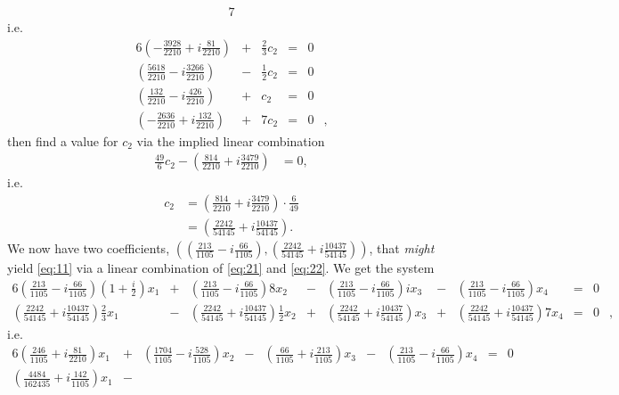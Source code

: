 \documentclass[12pt]{article}
\begin{document}
\begin{enumerate}
\begin{alignat*}{7}
      \end{alignat*}
      i.e.
      \begin{alignat*}{6}
        (-\frac{3928}{2210} + i\frac{81}{2210}) & {}+{} & \frac{2}{3}c_2 & {}={} & 0&\\
        (\frac{5618}{2210} - i\frac{3266}{2210}) & {}-{} & \frac{1}{2}c_2 & {}={} & 0&\\
       (\frac{132}{2210} -i\frac{426}{2210}) & {}+{} &            c_2 & {}={} & 0&\\
        (-\frac{2636}{2210} + i\frac{132}{2210}) & {}+{} &           7c_2 & {}={} & 0&,
      \end{alignat*}
      then find a value for $c_2$ via the implied linear
      combination
      \begin{align*}
        \frac{49}{6}c_2 - (\frac{814}{2210} + i\frac{3479}{2210}) &= 0,
      \end{align*}
      i.e.
      \begin{align*}
        c_2 &= (\frac{814}{2210} + i\frac{3479}{2210}) \cdot \frac{6}{49}\\
        &= (\frac{2242}{54145} + i\frac{10437}{54145}).
      \end{align*}
      We now have two coefficients, $((\frac{213}{1105} -
      i\frac{66}{1105}), (\frac{2242}{54145} +
      i\frac{10437}{54145}))$, that \textit{might} yield
      \eqref{eq:11} via a linear combination of \eqref{eq:21} and
      \eqref{eq:22}. We get the system
      \begin{alignat*}{6}
        (\frac{213}{1105} - i\frac{66}{1105})(1 + \frac{i}{2})x_1 & {}+{} &           (\frac{213}{1105} - i\frac{66}{1105})8x_2 & {}-{} & (\frac{213}{1105} - i\frac{66}{1105})ix_3 & {}-{} &  (\frac{213}{1105} - i\frac{66}{1105})x_4 & {}={} & 0 &\\
              (\frac{2242}{54145} + i\frac{10437}{54145})\frac{2}{3}x_1 & {}-{} & (\frac{2242}{54145} + i\frac{10437}{54145})\frac{1}{2}x_2 & {}+{} & (\frac{2242}{54145} + i\frac{10437}{54145})x_3 & {}+{} & (\frac{2242}{54145} + i\frac{10437}{54145})7x_4 & {}={}  & 0 &,
      \end{alignat*}
      i.e.
      \begin{alignat*}{6}
        (\frac{246}{1105} + i\frac{81}{2210})x_1 & {}+{} &
        (\frac{1704}{1105} - i\frac{528}{1105})x_2 & {}-{} &
        (\frac{66}{1105} + i\frac{213}{1105})x_3 & {}-{} & 
        (\frac{213}{1105} - i\frac{66}{1105})x_4 & {}={} & 0 &\\
        (\frac{4484}{162435} + i\frac{142}{1105})x_1 & {}-{} &

\end{alignat*}
\end{enumerate}
\end{document}
